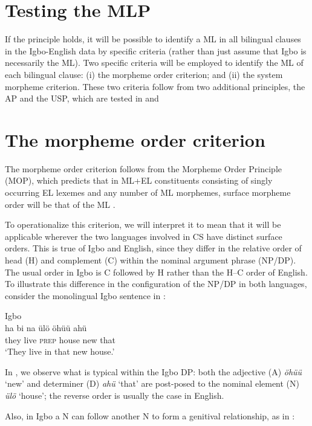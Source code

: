 \documentclass[output=paper]{langsci/langscibook}
\begin{document}
\section{Testing the MLP} 

If the principle holds, it will be possible to identify a ML in all bilingual clauses in the Igbo-English data by specific criteria (rather than just assume that Igbo is necessarily the ML). Two specific criteria will be employed to identify the ML of each bilingual clause: (i) the morpheme order criterion; and (ii) the system morpheme criterion. These two criteria follow from two additional principles, the AP and the USP, which are tested in  and 

\section{The morpheme order criterion}

The morpheme order criterion follows from the Morpheme Order Principle (MOP), which predicts that in ML+EL constituents consisting of singly occurring EL lexemes and any number of ML morphemes, surface morpheme order will be that of the ML \citep[59]{MyersScotton2002}. 

To operationalize this criterion, we will interpret it to mean that it will be applicable wherever the two languages involved in CS have distinct surface orders. This is true of Igbo and English, since they differ in the relative order of head (H) and complement (C) within the nominal argument phrase (NP/DP). The usual order in Igbo is C followed by H rather than the H–C order of English. To illustrate this difference in the configuration of the NP/DP in both languages, consider the monolingual Igbo sentence in :

\ea
{Igbo}\\
\gll ha    bi  na   ülö  öhüü  ahü\\
     they  live  \textsc{prep}  house  new  that\\
\glt ‘They live in that new house.’
\z

In , we observe what is typical within the Igbo DP: both the adjective (A) \textit{öhüü} ‘new’ and determiner (D) \textit{ahü} ‘that’ are post-posed to the nominal element (N) \textit{ülö} ‘house’; the reverse order is usually the case in English. 

Also, in Igbo a N can follow another N to form a genitival relationship, as in : 
\end{document}
